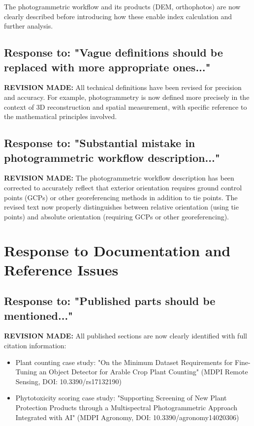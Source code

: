 \documentclass[11pt,a4paper]{article}
\begin{document}
The photogrammetric workflow and its products (DEM, orthophotos) are now clearly described before introducing how these enable index calculation and further analysis.

\subsection{Response to: "Vague definitions should be replaced with more appropriate ones..."}

\textbf{REVISION MADE:} All technical definitions have been revised for precision and accuracy. For example, photogrammetry is now defined more precisely in the context of 3D reconstruction and spatial measurement, with specific reference to the mathematical principles involved.

\subsection{Response to: "Substantial mistake in photogrammetric workflow description..."}

\textbf{REVISION MADE:} The photogrammetric workflow description has been corrected to accurately reflect that exterior orientation requires ground control points (GCPs) or other georeferencing methods in addition to tie points. The revised text now properly distinguishes between relative orientation (using tie points) and absolute orientation (requiring GCPs or other georeferencing).

\section{Response to Documentation and Reference Issues}

\subsection{Response to: "Published parts should be mentioned..."}

\textbf{REVISION MADE:} All published sections are now clearly identified with full citation information:
\begin{itemize}
\item Plant counting case study: "On the Minimum Dataset Requirements for Fine-Tuning an Object Detector for Arable Crop Plant Counting" (MDPI Remote Sensing, DOI: 10.3390/rs17132190)
\item Phytotoxicity scoring case study: "Supporting Screening of New Plant Protection Products through a Multispectral Photogrammetric Approach Integrated with AI" (MDPI Agronomy, DOI: 10.3390/agronomy14020306)
\end{itemize}
\end{document}
